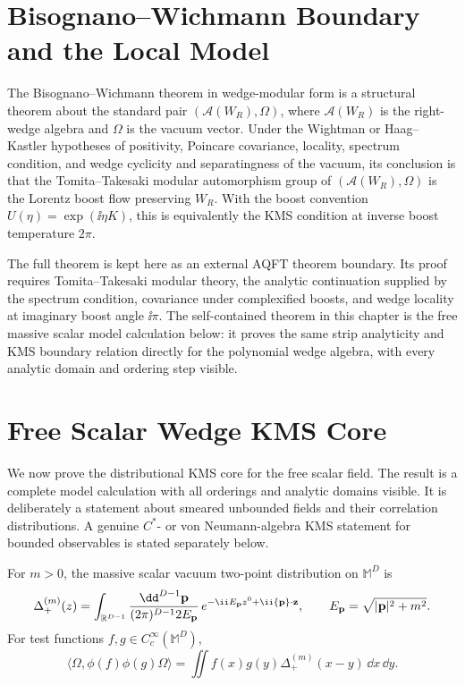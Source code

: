 \section{Bisognano--Wichmann Boundary and the Local Model}

\begin{remark}
\label{rem:bisognano-wichmann-boundary}
The Bisognano--Wichmann theorem in wedge-modular form is a structural theorem
about the standard pair \((\mathcal A(W_R),\Omega)\), where
\(\mathcal A(W_R)\) is the right-wedge algebra and \(\Omega\) is the vacuum
vector.  Under the Wightman or Haag--Kastler hypotheses of positivity,
Poincare covariance, locality, spectrum condition, and wedge cyclicity and
separatingness of the vacuum, its conclusion is that the Tomita--Takesaki
modular automorphism group of \((\mathcal A(W_R),\Omega)\) is the Lorentz
boost flow preserving \(W_R\).  With the boost convention
\(U(\eta)=\exp(\ii\eta K)\), this is equivalently the KMS condition at inverse
boost temperature \(2\pi\).

The full theorem is kept here as an external AQFT theorem boundary.  Its proof
requires Tomita--Takesaki modular theory, the analytic continuation supplied
by the spectrum condition, covariance under complexified boosts, and wedge
locality at imaginary boost angle \(\ii\pi\).  The self-contained theorem in
this chapter is the free massive scalar model calculation below: it proves the
same strip analyticity and KMS boundary relation directly for the polynomial
wedge algebra, with every analytic domain and ordering step visible.
\end{remark}

\section{Free Scalar Wedge KMS Core}

We now prove the distributional KMS core for the free scalar field.  The
result is a complete model calculation with all orderings and analytic
domains visible.  It is deliberately a statement about smeared unbounded
fields and their correlation distributions.  A genuine \(C^\ast\)- or von
Neumann-algebra KMS statement for bounded observables is stated separately
below.

\begin{definition}
\label{def:unruh-free-scalar-two-point}
For \(m>0\), the massive scalar vacuum two-point distribution on
\(\mathbb M^D\) is
\[
  \Delta_+^{(m)}(z)
  =
  \int_{\mathbb R^{D-1}}
  \frac{\dd^{D-1}{\bf p}}{(2\pi)^{D-1}2E_{\bf p}}\,
  e^{-\ii E_{\bf p}z^0+\ii{\bf p}\cdot{\bf z}},
  \qquad
  E_{\bf p}=\sqrt{|{\bf p}|^2+m^2}.
\]
For test functions \(f,g\in C_c^\infty(\mathbb M^D)\),
\[
  \langle\Omega,\phi(f)\phi(g)\Omega\rangle
  =
  \iint f(x)g(y)\Delta_+^{(m)}(x-y)\,\dd x\,\dd y .
\]
\end{definition}


